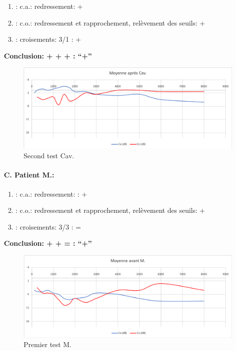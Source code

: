 	\begin{enumerate}

 		\item : c.a.: redressement: +

 		\item : c.o.: redressement et rapprochement, relèvement des seuils: +
 		\item : croisements: 3/1 :  +

                \end{enumerate}

                \textbf{  Conclusion:  + + +       : ``+''}

                \begin{figure}
\centering
\includegraphics[width=0.7\linewidth]{images/graphiques/cav_post.png}
\caption[Moyenne OG+OD]{Second test Cav.}

                \end{figure}




               \paragraph{ C. Patient M.:}


	\begin{enumerate}

 		\item : c.a.: redressement: : +   %

 		\item : c.o.: redressement et rapprochement,
                  relèvement des seuils:  +     %
 		\item : croisements: 3/3 :  =

                \end{enumerate}

                \textbf{  Conclusion:  +  +  =     : ``+''}

                \begin{figure}[th]
\centering
\includegraphics[width=0.7\linewidth]{images/graphiques/m_pre.png}
\caption[Moyenne OG+OD]{Premier test M.}

\end{figure}


